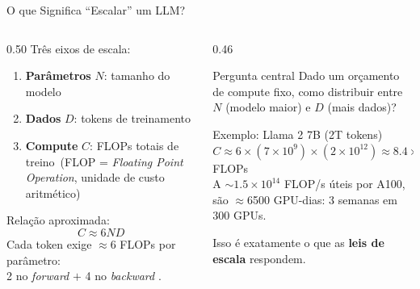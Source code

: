\documentclass[aspectratio=169, xcolor=dvipsnames]{beamer}
\begin{document}
  \begin{frame}{O que Significa ``Escalar'' um LLM?}
    \begin{columns}[T]
      \begin{column}{0.50\textwidth}
        Três eixos de escala:
        \begin{enumerate}
          \item \textbf{Parâmetros} $N$: tamanho do modelo
          \item \textbf{Dados} $D$: tokens de treinamento
          \item \textbf{Compute} $C$: FLOPs totais de treino{\footnotesize\ (FLOP = \textit{Floating Point Operation}, unidade de custo aritmético)}
        \end{enumerate}
        \vspace{0.4em}
        Relação aproximada:
        \[
          C \approx 6 N D
        \]
        Cada token exige $\approx$6 FLOPs por parâmetro:\\
        2 no \textit{forward} $+$ 4 no \textit{backward} \cite{kaplan2020scaling}.
      \end{column}
      \begin{column}{0.46\textwidth}
        \begin{alertblock}{Pergunta central}
          Dado um orçamento de compute fixo, como distribuir entre $N$ (modelo maior) e $D$ (mais dados)?
        \end{alertblock}
        \vspace{0.4em}
        \begin{exampleblock}{Exemplo: Llama 2 7B (2T tokens)}
          $C \approx 6 \times (7{\times}10^{9}) \times (2{\times}10^{12}) \approx 8.4{\times}10^{22}$ FLOPs\\[2pt]
          {\footnotesize A $\sim\!1.5{\times}10^{14}$ FLOP/s úteis por A100, são $\approx$6500 GPU-dias: 3 semanas em 300 GPUs.}
        \end{exampleblock}
        \vspace{0.3em}
        Isso é exatamente o que as \textbf{leis de escala} respondem.
      \end{column}
    \end{columns}
  \end{frame}
\end{document}
